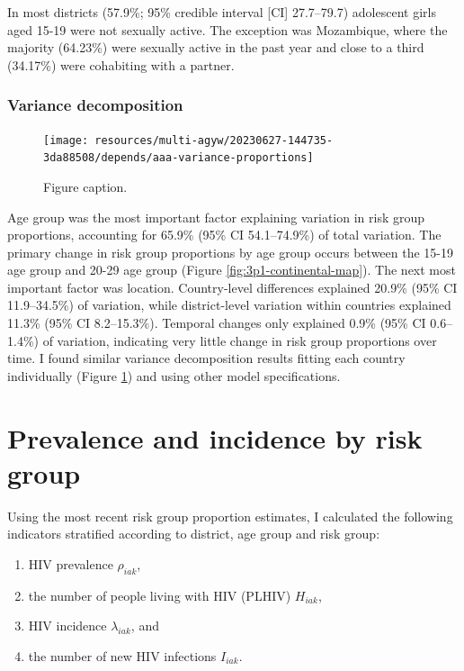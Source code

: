 \documentclass[a4paper, nobind]{templates/ociamthesis}
\providecommand{\tightlist}{%
  \setlength{\itemsep}{0pt}\setlength{\parskip}{0pt}}
\begin{document}
In most districts (57.9\%; 95\% credible interval {[}CI{]} 27.7--79.7) adolescent girls aged 15-19 were not sexually active.
The exception was Mozambique, where the majority (64.23\%) were sexually active in the past year and close to a third (34.17\%) were cohabiting with a partner.

\hypertarget{variance-decomposition}{%
\subsubsection{Variance decomposition}\label{variance-decomposition}}



\begin{figure}
\texttt{[image: resources/multi-agyw/20230627-144735-3da88508/depends/aaa-variance-proportions]} \caption{Figure caption.}\label{fig:aaa-variance-proportions}
\end{figure}

Age group was the most important factor explaining variation in risk group proportions, accounting for 65.9\% (95\% CI 54.1--74.9\%) of total variation.
The primary change in risk group proportions by age group occurs between the 15-19 age group and 20-29 age group (Figure \ref{fig:3p1-continental-map}).
The next most important factor was location.
Country-level differences explained 20.9\% (95\% CI 11.9--34.5\%) of variation, while district-level variation within countries explained 11.3\% (95\% CI 8.2--15.3\%).
Temporal changes only explained 0.9\% (95\% CI 0.6--1.4\%) of variation, indicating very little change in risk group proportions over time.
I found similar variance decomposition results fitting each country individually (Figure \ref{fig:aaa-variance-proportions}) and using other model specifications.

\hypertarget{prevalence-and-incidence-by-risk-group}{%
\section{Prevalence and incidence by risk group}\label{prevalence-and-incidence-by-risk-group}}

Using the most recent risk group proportion estimates, I calculated the following indicators stratified according to district, age group and risk group:

\begin{enumerate}
\def\labelenumi{\arabic{enumi}.}
\tightlist
\item
  HIV prevalence \(\rho_{iak}\),
\item
  the number of people living with HIV (PLHIV) \(H_{iak}\),
\item
  HIV incidence \(\lambda_{iak}\), and
\item
  the number of new HIV infections \(I_{iak}\).
\end{enumerate}
\end{document}
